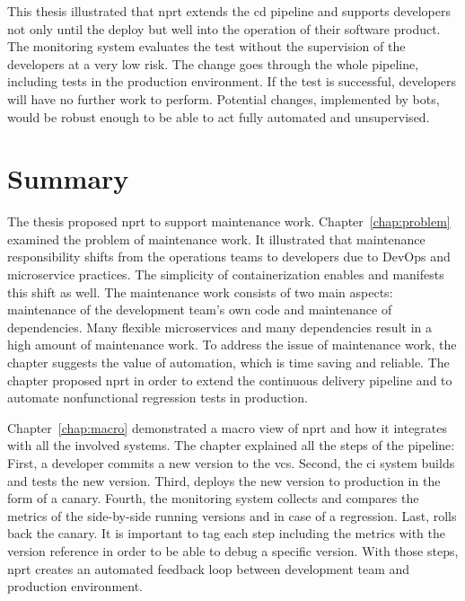 This thesis illustrated that \gls{nprt} extends the \gls{cd} pipeline and supports
developers not only until the deploy but well into the operation of their software
product. The monitoring system evaluates the test without the supervision of the
developers at a very low risk. The change goes through the whole pipeline, including tests
in the production environment. If the test is successful, developers will have no further
work to perform. Potential changes, implemented by bots, would be robust enough to be able
to act fully automated and unsupervised.

\section{Summary}

The thesis proposed \gls{nprt} to support maintenance work. Chapter~\ref{chap:problem}
examined the problem of maintenance work. It illustrated that maintenance responsibility
shifts from the operations teams to developers due to DevOps and microservice
practices. The simplicity of containerization enables and manifests this shift as
well. The maintenance work consists of two main aspects: maintenance of the development
team’s own code and maintenance of dependencies. Many flexible microservices and many
dependencies result in a high amount of maintenance work. To address the issue of
maintenance work, the chapter suggests the value of automation, which is time saving and
reliable. The chapter proposed \gls{nprt} in order to extend the continuous delivery
pipeline and to automate nonfunctional regression tests in production.

Chapter~\ref{chap:macro} demonstrated a macro view of \gls{nprt} and how it integrates
with all the involved systems. The chapter explained all the steps of the pipeline: First,
a developer commits a new version to the \gls{vcs}. Second, the \gls{ci} system builds and
tests the new version. Third, \deployer{} deploys the new version to production in the form
of a canary. Fourth, the monitoring system collects and compares the metrics of the
side-by-side running versions and in case of a regression. Last, \deployer{} rolls back the
canary. It is important to tag each step including the metrics with the version reference
in order to be able to debug a specific version. With those steps, \gls{nprt} creates an
automated feedback loop between development team and production environment.

